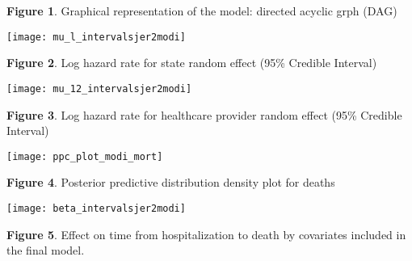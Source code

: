 \documentclass[10pt,letterpaper]{article}
\begin{document}
\textbf{Figure 1}. Graphical representation of the model: directed
acyclic grph (DAG)

\begin{center}\texttt{[image: mu\_l\_intervalsjer2modi]} \end{center}

\textbf{Figure 2}. Log hazard rate for state random effect (95\%
Credible Interval)

\begin{center}\texttt{[image: mu\_12\_intervalsjer2modi]} \end{center}

\textbf{Figure 3}. Log hazard rate for healthcare provider random effect
(95\% Credible Interval)

\begin{center}\texttt{[image: ppc\_plot\_modi\_mort]} \end{center}

\textbf{Figure 4}. Posterior predictive distribution density plot for
deaths

\begin{center}\texttt{[image: beta\_intervalsjer2modi]} \end{center}

\textbf{Figure 5}. Effect on time from hospitalization to death by
covariates included in the final model.

\nolinenumbers
\end{document}
